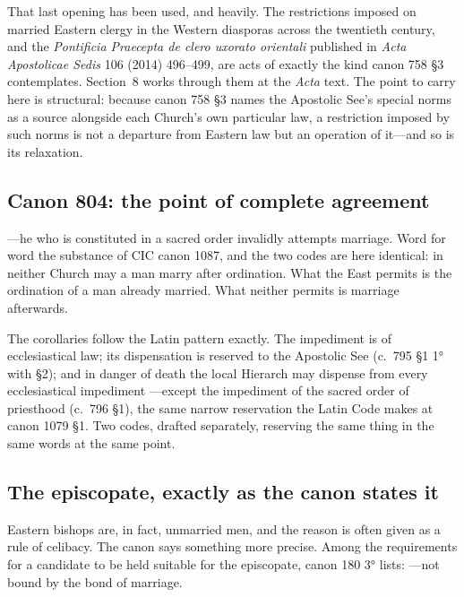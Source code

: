 That last opening has been used, and heavily. The restrictions imposed on married Eastern clergy in the Western diasporas across the twentieth century, and the \emph{Pontificia Praecepta de clero uxorato orientali} published in \emph{Acta Apostolicae Sedis} 106 (2014) 496--499, are acts of exactly the kind canon 758 §3 contemplates. Section~8 works through them at the \emph{Acta} text. The point to carry here is structural: because canon 758 §3 names the Apostolic See's special norms as a source alongside each Church's own particular law, a restriction imposed by such norms is not a departure from Eastern law but an operation of it---and so is its relaxation.

\subsection{Canon 804: the point of complete agreement}

---he who is constituted in a sacred order invalidly attempts marriage. Word for word the substance of CIC canon 1087, and the two codes are here identical: in neither Church may a man marry after ordination. What the East permits is the ordination of a man already married. What neither permits is marriage afterwards.

The corollaries follow the Latin pattern exactly. The impediment is of ecclesiastical law; its dispensation is reserved to the Apostolic See (c.~795 §1 1° with §2); and in danger of death the local Hierarch may dispense from every ecclesiastical impediment ---except the impediment of the sacred order of priesthood (c.~796 §1), the same narrow reservation the Latin Code makes at canon 1079 §1. Two codes, drafted separately, reserving the same thing in the same words at the same point.

\subsection{The episcopate, exactly as the canon states it}

Eastern bishops are, in fact, unmarried men, and the reason is often given as a rule of celibacy. The canon says something more precise. Among the requirements for a candidate to be held suitable for the episcopate, canon 180 3° lists: ---not bound by the bond of marriage.

